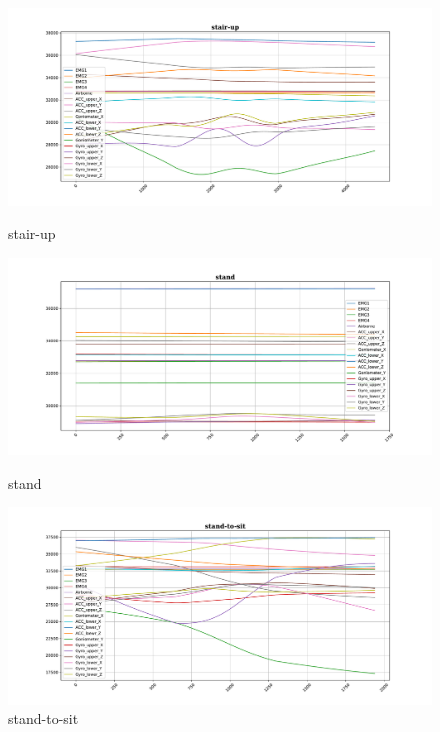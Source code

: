 \begin{figure}[!tbp]
	\begin{minipage}[b]{0.31\textwidth}
		\includegraphics[width=\textwidth]{images/stair-up_example.pdf}
		\caption{stair-up}
	\end{minipage}
	\begin{minipage}[b]{0.31\textwidth}
		\includegraphics[width=\textwidth]{images/stand_example.pdf}
		\caption{stand}
	\end{minipage}
	\begin{minipage}[b]{0.31\textwidth}
		\includegraphics[width=\textwidth]{images/stand-to-sit_example.pdf}
		\caption{stand-to-sit}
	\end{minipage}
\end{figure}

